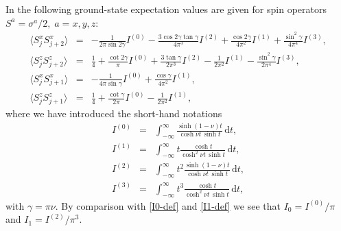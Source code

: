 \documentclass[a4paper,10pt]{article}
\begin{document}
In \cite{Go_Kato} the following ground-state expectation values are given for spin operators $S^a=\sigma^a/2,\; a=x,y,z$:
\begin{subequations}\label{spin_expectation}
\begin{eqnarray}
\langle  S_j^x S_{j+2}^x \rangle &=& 
-\frac{1}{2\pi\sin 2\gamma} I^{(0)} - \frac{3\cos 2\gamma \tan \gamma }{4\pi^3}I^{(2)}+\frac{\cos 2\gamma}{4\pi^2} I^{(1)} + \frac{\sin^2\!\gamma}{4\pi^4}I^{(3)},
\\
\langle  S_j^z S_{j+2}^z \rangle &=& 
\frac{1}{4} + \frac{\cot 2\gamma}{\pi} I^{(0)} + \frac{3 \tan \gamma}{2\pi^3} I^{(2)} 
- \frac{1}{2\pi^2}I^{(1)} - \frac{\sin^2\!\gamma}{2\pi^4} I^{(3)},\\ 
\langle  S_j^x S_{j+1}^x \rangle &=& 
-\frac{1}{4\pi \sin\gamma} I^{(0)} + \frac{\cos\gamma}{4\pi^2} I^{(1)},\\
\langle  S_j^z S_{j+1}^z \rangle &=&
\frac{1}{4}+\frac{\cot\gamma}{2\pi} I^{(0)} - \frac{1}{2\pi^2}I^{(1)},
\end{eqnarray}
\end{subequations}
where we have introduced the short-hand notations
\begin{subequations}
\begin{eqnarray}
I^{(0)} &=& \int_{-\infty}^\infty \frac{\sinh (1-\nu)t}{\cosh \nu t \, \sinh t} \, \mathrm{d} t, \\
%
I^{(1)} &=& \int_{-\infty}^\infty t \frac{\cosh t }{\cosh^2\!\nu t \, \sinh t}  \, \mathrm{d} t,
\\
%
I^{(2)} &=& \int_{-\infty}^\infty t^2 \frac{\sinh (1-\nu)t}{\cosh \nu t \, \sinh t} \, \mathrm{d} t ,\\
%
I^{(3)} &=& \int_{-\infty}^\infty t^3 \frac{\cosh t }{\cosh^2\!\nu t \, \sinh t}  \, \mathrm{d} t,
%
\end{eqnarray}
\end{subequations}
with $\gamma=\pi\nu$. 
By comparison with \eqref{I0-def} and \eqref{I1-def} we see that $I_0 = I^{(0)}/\pi$ and $I_1 = I^{(2)}/\pi^3$. 
\end{document}
